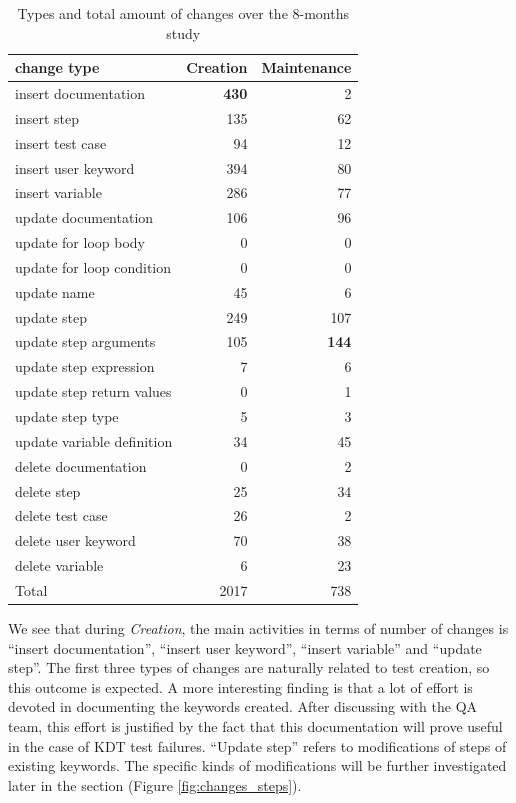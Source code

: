 \begin{table}
\caption{Types and total amount of changes over the 8-months study}
\label{table:total_changes}
\centering
\begin{tabular}{lrr}
\toprule
change type &  Creation &  Maintenance \\
\midrule
insert documentation          &       \textbf{430} &            2 \\
insert step                   &       135 &           62 \\
insert test case              &        94 &           12 \\
insert user keyword           &       394 &           80 \\
insert variable               &       286 &           77 \\
update documentation       &       106 &           96 \\
update for loop body       &         0 &            0 \\
update for loop condition  &         0 &            0 \\
update name                &        45 &            6 \\
update step                &       249 &          107 \\
update step arguments      &       105 &          \textbf{144} \\
update step expression     &         7 &            6 \\
update step return values  &         0 &            1 \\
update step type           &         5 &            3 \\
update variable definition &        34 &           45 \\
delete documentation       &         0 &            2 \\
delete step                &        25 &           34 \\
delete test case           &        26 &            2 \\
delete user keyword        &        70 &           38 \\
delete variable            &         6 &           23 \\
\midrule
Total                      &      2017 &          738 \\
\bottomrule
\end{tabular}
\end{table}

We see that during \emph{Creation}, the main activities in terms of number of changes is ``insert documentation'', ``insert user keyword'', ``insert variable'' and ``update step''. The first three types of changes are naturally related to test creation, so this outcome is expected. A more interesting finding is that a lot of effort is devoted in documenting the keywords created. After discussing with the QA team, this effort is justified by the fact that this documentation will prove useful in the case of KDT test failures. ``Update step'' refers to modifications of steps of existing keywords. The specific kinds of modifications will be further investigated later in the section (Figure \ref{fig:changes_steps}).
  
